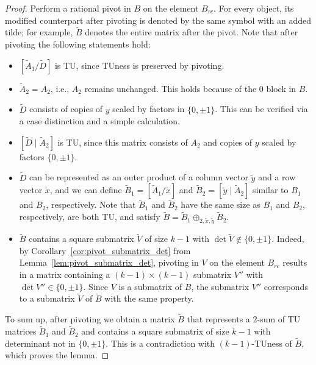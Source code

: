 \documentclass{article}
\theoremstyle{definition}
\begin{document}
\begin{proof}
    Perform a rational pivot in $B$ on the element $B_{rc}$. For every object, its modified counterpart after pivoting is denoted by the same symbol with an added tilde; for example, $\tilde{B}$ denotes the entire matrix after the pivot. Note that after pivoting the following statements hold:
    \begin{itemize}
        \item $\left[\tilde{A}_{1} / \tilde{D}\right]$ is TU, since TUness is preserved by pivoting.
        \item $\tilde{A}_{2} = A_{2}$, i.e., $A_{2}$ remains unchanged. This holds because of the $0$ block in $B$.
        \item $\tilde{D}$ consists of copies of $y$ scaled by factors in $\{0, \pm 1\}$. This can be verified via a case distinction and a simple calculation.
        \item $\left[\tilde{D} \mid \tilde{A}_{2}\right]$ is TU, since this matrix consists of $A_{2}$ and copies of $y$ scaled by factors $\{0, \pm 1\}$.
        \item $\tilde{D}$ can be represented as an outer product of a column vector $\tilde{y}$ and a row vector $\tilde{x}$, and we can define $\tilde{B}_{1} = \left[\tilde{A}_{1} / \tilde{x}\right]$ and $\tilde{B}_{2} = \left[\tilde{y} \mid \tilde{A}_{2}\right]$ similar to $B_{1}$ and $B_{2}$, respectively. Note that $\tilde{B}_{1}$ and $\tilde{B}_{2}$ have the same size as $B_{1}$ and $B_{2}$, respectively, are both TU, and satisfy $\tilde{B} = \tilde{B}_{1} \oplus_{2, \tilde{x}, \tilde{y}} \tilde{B}_{2}$.
        \item $\tilde{B}$ contains a square submatrix $\tilde{V}$ of size $k - 1$ with $\det \tilde{V} \notin \{0, \pm 1\}$. Indeed, by Corollary~\ref{cor:pivot_submatrix_det} from Lemma~\ref{lem:pivot_submatrix_det}, pivoting in $V$ on the element $B_{rc}$ results in a matrix containing a $(k - 1) \times (k - 1)$ submatrix $V''$ with $\det V'' \in \{0, \pm 1\}$. Since $V$ is a submatrix of $B$, the submatrix $V''$ corresponds to a submatrix $\tilde{V}$ of $\tilde{B}$ with the same property.
    \end{itemize}
    To sum up, after pivoting we obtain a matrix $\tilde{B}$ that represents a $2$-sum of TU matrices $\tilde{B}_{1}$ and $\tilde{B}_{2}$ and contains a square submatrix of size $k - 1$ with determinant not in $\{0, \pm 1\}$. This is a contradiction with $(k - 1)$-TUness of $\tilde{B}$, which proves the lemma.
\end{proof}
\end{document}
